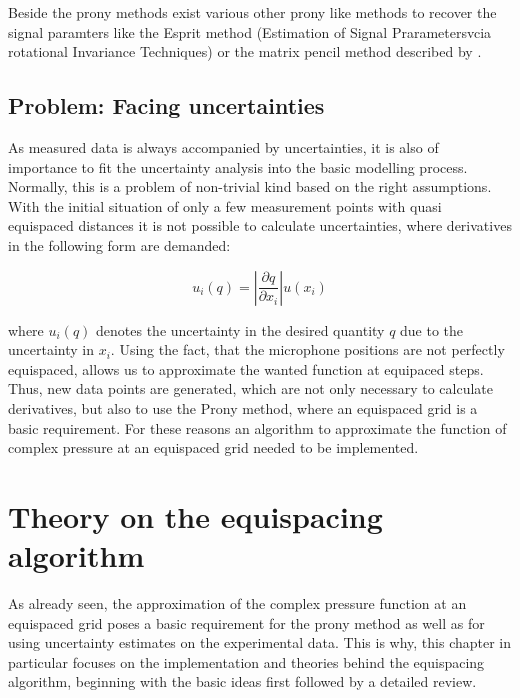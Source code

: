 \documentclass[11pt]{report} %
\begin{document}
Beside the prony methods exist various other prony like methods to recover the signal paramters like the Esprit method (Estimation of Signal Prarametersvcia rotational Invariance Techniques) or the matrix pencil method described by \cite{Potts}.

\section{Problem: Facing uncertainties}
As measured data is always accompanied by uncertainties, it is also of importance to fit the uncertainty analysis into the basic modelling process.
Normally, this is a problem of non-trivial kind based on the right assumptions.
With the initial situation of only a few measurement points with quasi equispaced distances it is not possible to calculate uncertainties, where derivatives in the following form are demanded:

\begin{equation}
u_{i}(q)= \left\vert \frac{\partial q}{\partial x_{i}} \right\vert u( x_{i})
\end{equation}

where $u_{i}(q)$ denotes the uncertainty in the desired quantity $q$ due to the uncertainty in $x_{i}$.
Using the fact, that the microphone positions are not perfectly equispaced, allows us to approximate the wanted function at equipaced steps.
Thus, new data points are generated, which are not only necessary to calculate derivatives, but also to use the Prony method, where an equispaced grid is a basic requirement.
For these reasons an algorithm to approximate the function of complex pressure at an equispaced grid needed to be implemented. 
  
\chapter{Theory on the equispacing algorithm} 
As already seen, the approximation of the complex pressure function at an equispaced grid poses a basic requirement for the prony method as well as for using uncertainty estimates on the experimental data.
This is why, this chapter in particular focuses on the implementation and theories behind the equispacing algorithm, beginning with the basic ideas first followed by a detailed review. 
\end{document}
